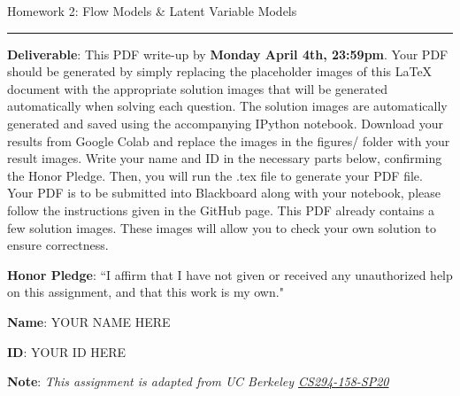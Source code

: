 \documentclass{article}
\newcommand{\ruleskip}{\bigskip\hrule\bigskip}
\begin{document}
\pagestyle{myheadings} 

{\huge
\noindent Homework 2: Flow Models \& Latent Variable Models}
\ruleskip

{\bf Deliverable}: This PDF write-up by {\bf Monday April 4th, 23:59pm}.  Your PDF should be generated by simply replacing the placeholder images of this LaTeX document with the appropriate solution images that will be generated automatically when solving each question. The solution images are automatically generated and saved using the accompanying IPython notebook.  Download your results from Google Colab and replace the images in the figures/ folder with your result images. Write your name and ID in the necessary parts below, confirming the Honor Pledge. Then, you will run the .tex file to generate your PDF file. Your PDF is to be submitted into Blackboard along with your notebook, please follow the instructions given in the GitHub page. This PDF already contains a few solution images.  These images will allow you to check your own solution to ensure correctness.

{\bf Honor Pledge}: ``I affirm that I have not given or received any unauthorized help on this assignment, and that this work is my own."

{\bf Name}: YOUR NAME HERE

{\bf ID}: YOUR ID HERE

\vspace{.1in}

{\bf Note}: \textit{This assignment is adapted from UC Berkeley \href{https://sites.google.com/view/berkeley-cs294-158-sp20/home}{CS294-158-SP20}}
\vspace{.2in}

\end{document}

